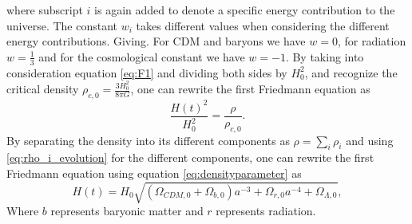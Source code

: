 where subscript $i$ is again added to denote a specific energy contribution to
the universe. The constant $w_i$ takes different values when considering the
different energy contributions. Giving. For CDM and baryons we have $w=0$, for
radiation $w=\frac{1}{3}$ and for the cosmological constant we have $w=-1$. By
taking into consideration equation \ref{eq:F1} and dividing both sides by $H_0^2$,
and recognize the critical density $\rho_{c,0}=\frac{3H_0^2}{8\pi G}$, one can
rewrite the first Friedmann equation as
\begin{equation}
    \frac{H(t)^2}{H_0^2}=\frac{\rho}{\rho_{c,0}}.
\end{equation}
By separating the density into its different components as $\rho=\sum_i\rho_i$
and using \ref{eq:rho_i_evolution} for the different components, one can rewrite
the first Friedmann equation using equation \ref{eq:densityparameter} as
\begin{equation}
    H(t)=H_0\sqrt{(\Omega_{CDM,0} + \Omega_{b,0})a^{-3} + \Omega_{r,0}a^{-4} + \Omega_{\Lambda,0}},
\end{equation}
Where $b$ represents baryonic matter and $r$ represents radiation.


